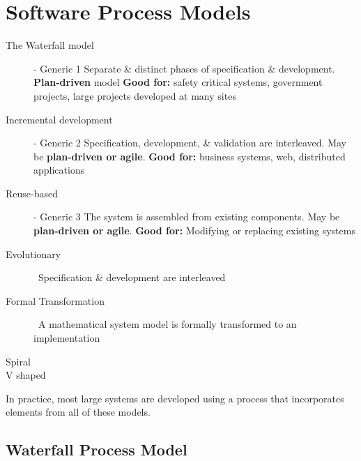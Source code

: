 \documentclass{report}
\begin{document}
\section{Software Process Models}
\begin{description}
  \item [The Waterfall model] - Generic 1 \newline Separate \& distinct phases of specification \& development.  \textbf{Plan-driven} model\newline
  \textbf{Good for:} safety critical systems, government projects, large projects developed at many sites
  \item [Incremental development] - Generic 2 \newline Specification, development, \& validation are interleaved. May be \textbf{plan-driven or agile}.\newline
  \textbf{Good for:} business systems, web, distributed applications
  \item [Reuse-based] - Generic 3 \newline The system is assembled from existing components. May be \textbf{plan-driven or agile}.\newline
  \textbf{Good for:} Modifying or replacing existing systems
  \item [Evolutionary] \ \newline Specification \& development are interleaved
  \item [Formal Transformation] \ \newline A mathematical system model is formally transformed to an implementation
  \item [Spiral]
  \item [V shaped]
\end{description}
In practice, most large systems are developed using a process that incorporates elements from all of these models.

\newpage

\subsection{Waterfall Process Model}
\end{document}
